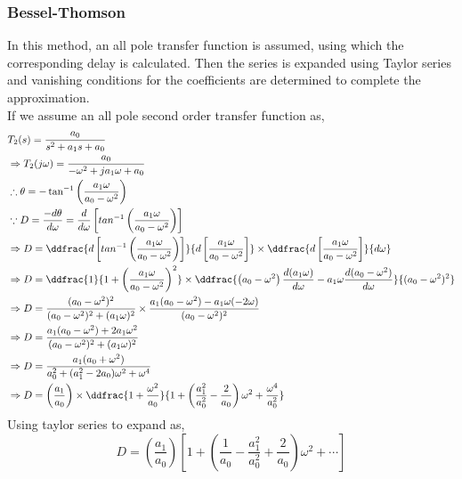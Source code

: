 \subsubsection*{Bessel-Thomson}
In this method, an all pole transfer function is assumed, using which the corresponding delay is calculated. Then the series is expanded using Taylor series and vanishing conditions for the coefficients are determined to complete the approximation.\\
If we assume an all pole second order transfer function as,
\begin{equation*}
    \begin{aligned}
        &T_2(s)=\frac{a_0}{s^2+a_1s+a_0}\\
        &\Rightarrow T_2(j\omega)=\frac{a_0}{-\omega^2+ja_1\omega+a_0}\\
        &\therefore \theta=-\tan^{-1}\left(\frac{a_1\omega}{a_0-\omega^2}\right)\\
        &\because D=\frac{-d\theta}{d\omega}=\frac{d}{d\omega}\left[tan^{-1}\left(\frac{a_1\omega}{a_0-\omega^2}\right)\right]\\
        &\Rightarrow D=\ddfrac{d\left[tan^{-1}\left(\frac{a_1\omega}{a_0-\omega^2}\right)\right]}{d\left[\frac{a_1\omega}{a_0-\omega^2}\right]}\times\ddfrac{d\left[\frac{a_1\omega}{a_0-\omega^2}\right]}{d\omega}\\
        &\Rightarrow D=\ddfrac{1}{1+\left(\frac{a_1\omega}{a_0-\omega^2}\right)^2}\times\ddfrac{\left(a_0-\omega^2\right)\frac{d(a_1\omega)}{d\omega}-a_1\omega\frac{d(a_0-\omega^2)}{d\omega}}{(a_0-\omega^2)^2}\\
        &\Rightarrow D=\frac{(a_0-\omega^2)^2}{(a_0-\omega^2)^2+(a_1\omega)^2}\times\frac{a_1(a_0-\omega^2)-a_1\omega(-2\omega)}{(a_0-\omega^2)^2}\\
        &\Rightarrow D=\frac{a_1(a_0-\omega^2)+2a_1\omega^2}{(a_0-\omega^2)^2+(a_1\omega)^2}\\
        &\Rightarrow D=\frac{a_1(a_0+\omega^2)}{a_0^2+(a_1^2-2a_0)\omega^2+\omega^4}\\
        &\Rightarrow D=\left(\frac{a_1}{a_0}\right)\times\ddfrac{1+\frac{\omega^2}{a_0}}{1+\left(\frac{a_1^2}{a_0^2}-\frac{2}{a_0}\right)\omega^2+\frac{\omega^4}{a_0^2}}
    \end{aligned}
\end{equation*}
Using taylor series to expand as,
\begin{equation*}
    D=\left(\frac{a_1}{a_0}\right)\left[1+\left(\frac{1}{a_0}-\frac{a_1^2}{a_0^2}+\frac{2}{a_0}\right)\omega^2+\cdots\right]
\end{equation*}

